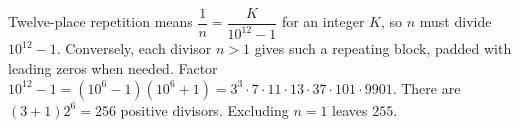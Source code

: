 Twelve-place repetition means $\dfrac{1}{n}=\dfrac{K}{10^{12}-1}$ for an integer $K$, so $n$ must divide $10^{12}-1$. Conversely, each divisor $n>1$ gives such a repeating block, padded with leading zeros when needed. Factor $10^{12}-1=(10^6-1)(10^6+1)=3^3\cdot7\cdot11\cdot13\cdot37\cdot101\cdot9901$. There are $(3+1)2^6=256$ positive divisors. Excluding $n=1$ leaves $\boxed{255}$.
